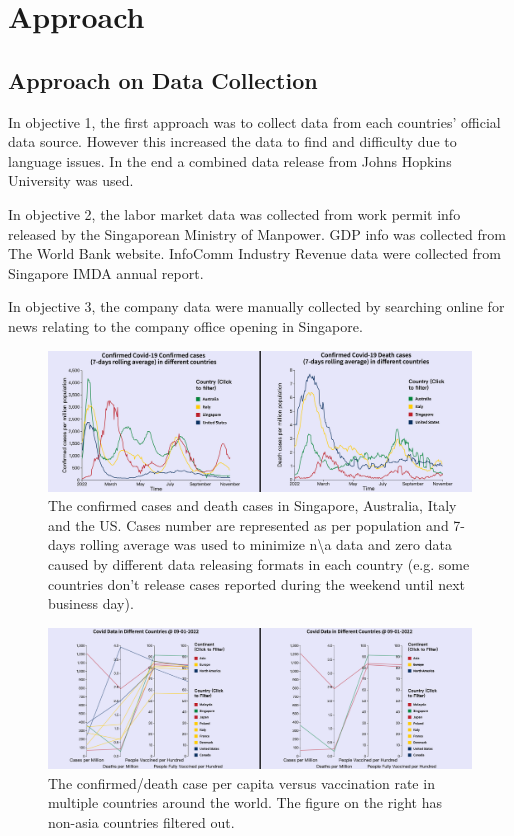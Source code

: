 \documentclass[conference]{IEEEtran}
\begin{document}
\section{Approach}
\subsection{Approach on Data Collection}
In objective 1, the first approach was to collect data from each countries’ official data source. However this increased the data to find and difficulty due to language issues. In the end a combined data release from Johns Hopkins University\cite{ourworld} was used.

In objective 2, the labor market data was collected from work permit info released by the Singaporean Ministry of Manpower\cite{foreign_workforce}. GDP info was collected from The World Bank website\cite{world_bank}. InfoComm Industry Revenue data were collected from Singapore IMDA annual report\cite{imda_reports}.

In objective 3, the company data were manually collected by searching online for news relating to the company office opening in Singapore.

\begin{figure}[!t]
\centering
\includegraphics[width=7.0in]{2}
\caption{The confirmed cases and death cases in Singapore, Australia, Italy and the US. Cases number are represented as per population and 7-days rolling average was used to minimize n\textbackslash a data and zero data caused by different data releasing formats in each country (e.g. some countries don’t release cases reported during the weekend until next business day).}
\label{fig:2}
\end{figure}
\begin{figure}[!t]
\centering
\includegraphics[width=7.0in]{3}
\caption{The confirmed/death case per capita versus vaccination rate in multiple countries around the world. The figure on the right has non-asia countries filtered out.}
\label{fig:3}
\end{figure}
\end{document}
